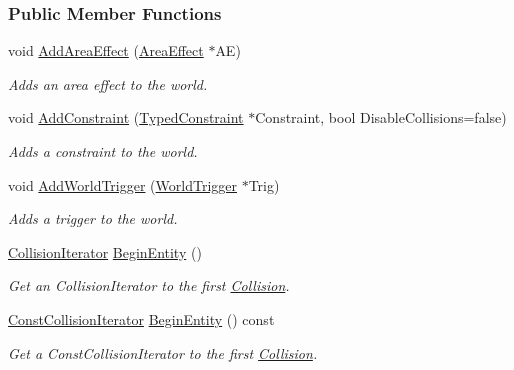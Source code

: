 \subsubsection*{Public Member Functions}
\begin{DoxyCompactItemize}
\item 
void \hyperlink{classMezzanine_1_1PhysicsManager_a62c7bb223d2712a4f1806216429015a9}{AddAreaEffect} (\hyperlink{classMezzanine_1_1AreaEffect}{AreaEffect} $\ast$AE)
\begin{DoxyCompactList}\small\item\em Adds an area effect to the world. \item\end{DoxyCompactList}\item 
void \hyperlink{classMezzanine_1_1PhysicsManager_ae07ea8ae4877fcc3d0757e42d2726b65}{AddConstraint} (\hyperlink{classMezzanine_1_1TypedConstraint}{TypedConstraint} $\ast$Constraint, bool DisableCollisions=false)
\begin{DoxyCompactList}\small\item\em Adds a constraint to the world. \item\end{DoxyCompactList}\item 
void \hyperlink{classMezzanine_1_1PhysicsManager_a4dfbe87e03c09b1fcce946c9b9271fa6}{AddWorldTrigger} (\hyperlink{classMezzanine_1_1WorldTrigger}{WorldTrigger} $\ast$Trig)
\begin{DoxyCompactList}\small\item\em Adds a trigger to the world. \item\end{DoxyCompactList}\item 
\hyperlink{classMezzanine_1_1PhysicsManager_a8d2fa60cdfdc7997a09cb8a3434371af}{CollisionIterator} \hyperlink{classMezzanine_1_1PhysicsManager_a6633a616c8ff9739ec16d028d7ab5d27}{BeginEntity} ()
\begin{DoxyCompactList}\small\item\em Get an CollisionIterator to the first \hyperlink{classMezzanine_1_1Collision}{Collision}. \item\end{DoxyCompactList}\item 
\hyperlink{classMezzanine_1_1PhysicsManager_a667151fe9525d7f3f174ad55a499065f}{ConstCollisionIterator} \hyperlink{classMezzanine_1_1PhysicsManager_af38a7946fe715ce9aee66cff478c4619}{BeginEntity} () const 
\begin{DoxyCompactList}\small\item\em Get a ConstCollisionIterator to the first \hyperlink{classMezzanine_1_1Collision}{Collision}. \item\end{DoxyCompactList}\item 

\end{DoxyCompactItemize}
